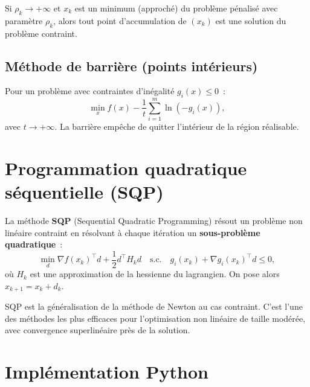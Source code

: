 \begin{theoreme}
Si $\rho_k \to +\infty$ et $x_k$ est un minimum (approch\'e) du probl\`eme
p\'enalis\'e avec param\`etre $\rho_k$, alors tout point d'accumulation de
$(x_k)$ est une solution du probl\`eme contraint.
\end{theoreme}

\subsection{M\'ethode de barri\`ere (points int\'erieurs)}

\begin{definition}
Pour un probl\`eme avec contraintes d'in\'egalit\'e $g_i(x) \leq 0$~:
\[
  \min_{x} f(x) - \frac{1}{t} \sum_{i=1}^m \ln(-g_i(x)),
\]
avec $t \to +\infty$. La barri\`ere emp\^eche de quitter l'int\'erieur de la
r\'egion r\'ealisable.
\end{definition}

\section{Programmation quadratique s\'equentielle (SQP)}

\begin{definition}[SQP]
La m\'ethode \textbf{SQP} (Sequential Quadratic Programming) r\'esout un
probl\`eme non lin\'eaire contraint en r\'esolvant \`a chaque it\'eration un
\textbf{sous-probl\`eme quadratique}~:
\[
  \min_{d} \nabla f(x_k)^\top d + \frac{1}{2} d^\top H_k d \quad
  \text{s.c.} \quad g_i(x_k) + \nabla g_i(x_k)^\top d \leq 0,
\]
o\`u $H_k$ est une approximation de la hessienne du lagrangien. On pose alors
$x_{k+1} = x_k + d_k$.
\end{definition}

\begin{remarque}
SQP est la g\'en\'eralisation de la m\'ethode de Newton au cas contraint.
C'est l'une des m\'ethodes les plus efficaces pour l'optimisation non
lin\'eaire de taille mod\'er\'ee, avec convergence superlin\'eaire pr\`es de
la solution.
\end{remarque}

\section{Impl\'ementation Python}

